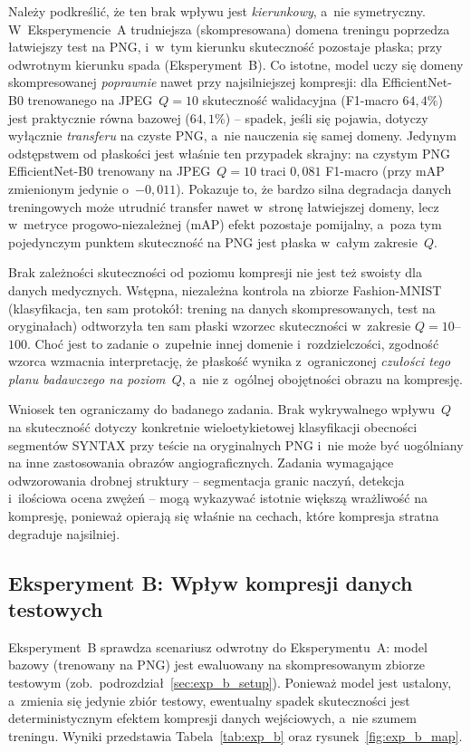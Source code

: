 \documentclass[12pt,a4paper]{article}
\begin{document}
Należy podkreślić, że ten brak wpływu jest \emph{kierunkowy}, a~nie symetryczny. W~Eksperymencie~A trudniejsza (skompresowana) domena treningu poprzedza łatwiejszy test na PNG, i~w~tym kierunku skuteczność pozostaje płaska; przy odwrotnym kierunku spada (Eksperyment~B). Co istotne, model uczy się domeny skompresowanej \emph{poprawnie} nawet przy najsilniejszej kompresji: dla EfficientNet-B0 trenowanego na JPEG~$Q=10$ skuteczność walidacyjna (F1-macro $64{,}4\%$) jest praktycznie równa bazowej ($64{,}1\%$) -- spadek, jeśli się pojawia, dotyczy wyłącznie \emph{transferu} na czyste PNG, a~nie nauczenia się samej domeny. Jedynym odstępstwem od płaskości jest właśnie ten przypadek skrajny: na czystym PNG EfficientNet-B0 trenowany na JPEG~$Q=10$ traci $0{,}081$ F1-macro (przy mAP zmienionym jedynie o~$-0{,}011$). Pokazuje to, że bardzo silna degradacja danych treningowych może utrudnić transfer nawet w~stronę łatwiejszej domeny, lecz w~metryce progowo-niezależnej (mAP) efekt pozostaje pomijalny, a~poza tym pojedynczym punktem skuteczność na PNG jest płaska w~całym zakresie~$Q$.

Brak zależności skuteczności od poziomu kompresji nie jest też swoisty dla danych medycznych. Wstępna, niezależna kontrola na zbiorze Fashion-MNIST (klasyfikacja, ten sam protokół: trening na danych skompresowanych, test na oryginałach) odtworzyła ten sam płaski wzorzec skuteczności w~zakresie $Q=10$--$100$. Choć jest to zadanie o~zupełnie innej domenie i~rozdzielczości, zgodność wzorca wzmacnia interpretację, że płaskość wynika z~ograniczonej \emph{czułości tego planu badawczego na poziom~$Q$}, a~nie z~ogólnej obojętności obrazu na kompresję.

Wniosek ten ograniczamy do badanego zadania. Brak wykrywalnego wpływu~$Q$ na skuteczność dotyczy konkretnie wieloetykietowej klasyfikacji obecności segmentów SYNTAX przy teście na oryginalnych PNG i~nie może być uogólniany na inne zastosowania obrazów angiograficznych. Zadania wymagające odwzorowania drobnej struktury -- segmentacja granic naczyń, detekcja i~ilościowa ocena zwężeń -- mogą wykazywać istotnie większą wrażliwość na kompresję, ponieważ opierają się właśnie na cechach, które kompresja stratna degraduje najsilniej.

\subsection{Eksperyment B: Wpływ kompresji danych testowych}
\label{sec:wyniki_b}

Eksperyment~B sprawdza scenariusz odwrotny do Eksperymentu~A: model bazowy (trenowany na PNG) jest ewaluowany na skompresowanym zbiorze testowym (zob.~podrozdział~\ref{sec:exp_b_setup}). Ponieważ model jest ustalony, a~zmienia się jedynie zbiór testowy, ewentualny spadek skuteczności jest deterministycznym efektem kompresji danych wejściowych, a~nie szumem treningu. Wyniki przedstawia Tabela~\ref{tab:exp_b} oraz rysunek~\ref{fig:exp_b_map}.
\end{document}
